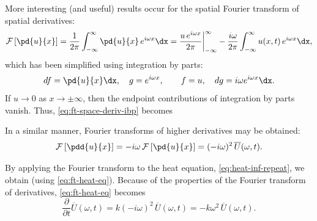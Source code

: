 More interesting (and useful) results occur for the spatial Fourier transform of spatial derivatives:
\begin{equation}
\label{eq:ft-space-deriv-ibp}
\mathcal{F}\left[\pd{u}{x}\right] = \frac{1}{2\pi}\int_{-\infty}^{\infty}\pd{u}{x}\,e^{i\omega x}\dx = \frac{u\,e^{i\omega x}}{2\pi}\bigg|_{-\infty}^{\infty} - \frac{i\omega}{2\pi}\int_{-\infty}^{\infty} u(x,t)\,e^{i\omega x}\dx,
\end{equation}
which has been simplified using integration by parts:
\[
df = \pd{u}{x}\dx, \quad g = e^{i\omega x}, \qquad f = u, \quad dg = i\omega e^{i\omega x}\dx.
\]
If $u \to 0$ as $x \to \pm\infty$, then the endpoint contributions of integration by parts vanish.  Thus, \eqref{eq:ft-space-deriv-ibp} becomes

In a similar manner, Fourier transforms of higher derivatives may be obtained:
\begin{equation}
\label{eq:ft-second-space}
\mathcal{F}\left[\pdd{u}{x}\right] = -i\omega\,\mathcal{F}\left[\pd{u}{x}\right] = (-i\omega)^2\,\overline{U}(\omega,t).
\end{equation}

\begin{center}
\end{center}

By applying the Fourier transform to the heat equation, \eqref{eq:heat-inf-repeat}, we obtain (using \eqref{eq:ft-heat-eq}).  Because of the properties of the Fourier transform of derivatives, \eqref{eq:ft-heat-eq} becomes
\begin{equation}
\label{eq:ft-heat-ode}
\frac{\partial}{\partial t}\overline{U}(\omega,t) = k(-i\omega)^2\,\overline{U}(\omega,t) = -k\omega^2\,\overline{U}(\omega,t).
\end{equation}

\begin{center}
\end{center}

